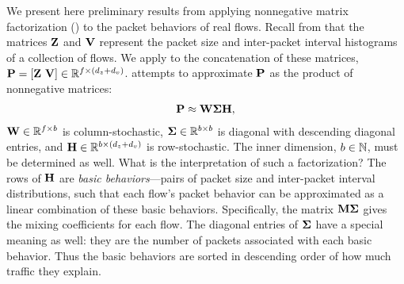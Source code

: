 \documentclass[twocolumn,final]{svjour3}
\begin{document}
We present here preliminary results from applying nonnegative matrix factorization () to the packet behaviors of real flows. Recall from  that the matrices $\mathbf{Z}$ and $\mathbf{V}$ represent the packet size and inter-packet interval histograms of a collection of flows.
We apply  to the concatenation of these matrices, $\mathbf{P}=[\mathbf{Z}~\mathbf{V}] \in \mathbb{R}^{f \times (d_z+d_v)}$.  attempts to approximate $\mathbf{P}$ as the product of nonnegative matrices:
\begin{align}
\mathbf{P} \approx \mathbf{W}\mathbf{\Sigma}\mathbf{H},
\end{align}
$\mathbf{W} \in \mathbb{R}^{f \times b}$ is column-stochastic, $\mathbf{\Sigma} \in \mathbb{R}^{b \times b}$ is diagonal with descending diagonal entries, and $\mathbf{H} \in \mathbb{R}^{b \times (d_z+d_v)}$ is row-stochastic.
The inner dimension, $b\in\mathbb{N}$, must be determined as well.
What is the interpretation of such a factorization?
The rows of $\mathbf{H}$ are \emph{basic behaviors}---pairs of packet size and inter-packet interval distributions, such that each flow's packet behavior can be approximated as a linear combination of these basic behaviors.
Specifically, the matrix $\mathbf{M}\mathbf{\Sigma}$ gives the mixing coefficients for each flow.
The diagonal entries of $\mathbf{\Sigma}$ have a special meaning as well:
they are the number of packets associated with each basic behavior.
Thus the basic behaviors are sorted in descending order of how much traffic they explain.
\end{document}
